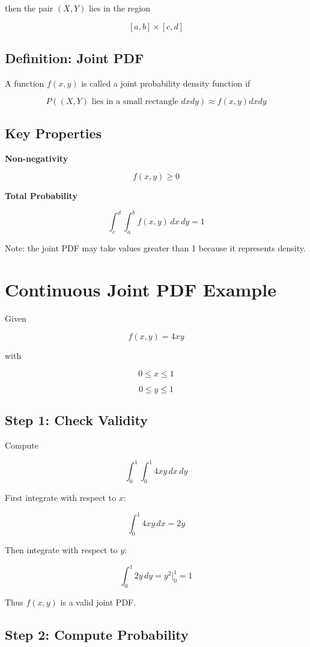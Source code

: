 \documentclass[12pt]{article}
\begin{document}
then the pair \((X,Y)\) lies in the region

\[
[a,b] \times [c,d]
\]

\subsection*{Definition: Joint PDF}

A function \(f(x,y)\) is called a joint probability density function if

\[
P((X,Y) \text{ lies in a small rectangle } dxdy) \approx f(x,y)dxdy
\]

\subsection*{Key Properties}

\textbf{Non-negativity}

\[
f(x,y) \ge 0
\]

\textbf{Total Probability}

\[
\int_{c}^{d}\int_{a}^{b} f(x,y)\,dx\,dy = 1
\]

Note: the joint PDF may take values greater than 1 because it represents density.

\section{Continuous Joint PDF Example}

Given

\[
f(x,y) = 4xy
\]

with

\[
0 \le x \le 1
\]

\[
0 \le y \le 1
\]

\subsection*{Step 1: Check Validity}

Compute

\[
\int_0^1 \int_0^1 4xy\,dx\,dy
\]

First integrate with respect to \(x\):

\[
\int_0^1 4xy\,dx = 2y
\]

Then integrate with respect to \(y\):

\[
\int_0^1 2y\,dy = y^2 \Big|_0^1 = 1
\]

Thus \(f(x,y)\) is a valid joint PDF.

\subsection*{Step 2: Compute Probability}
\end{document}
